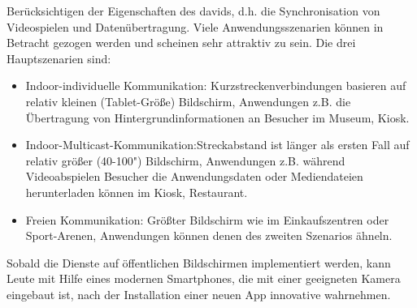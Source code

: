 Berücksichtigen der Eigenschaften des \gls{david}s, d.h. die Synchronisation von Videospielen und Datenübertragung. Viele Anwendungsszenarien können in Betracht gezogen werden und scheinen sehr attraktiv zu sein. Die drei Hauptszenarien sind:

\begin{itemize}
  \item Indoor-individuelle Kommunikation: Kurzstreckenverbindungen basieren auf relativ kleinen (Tablet-Größe) Bildschirm, Anwendungen z.B. die Übertragung von Hintergrundinformationen an Besucher im Museum, Kiosk.
  \item Indoor-Multicast-Kommunikation:Streckabstand ist länger als ersten Fall auf relativ größer (40-100") Bildschirm, Anwendungen z.B. während Videoabspielen Besucher die Anwendungsdaten oder Mediendateien herunterladen können im Kiosk, Restaurant.
  \item Freien Kommunikation: Größter Bildschirm wie im Einkaufszentren oder Sport-Arenen, Anwendungen können denen des zweiten Szenarios ähneln.
\end{itemize}

Sobald die Dienste auf öffentlichen Bildschirmen implementiert werden, kann Leute mit Hilfe eines modernen Smartphones, die mit einer geeigneten Kamera eingebaut ist, nach der Installation einer neuen App innovative wahrnehmen.





















